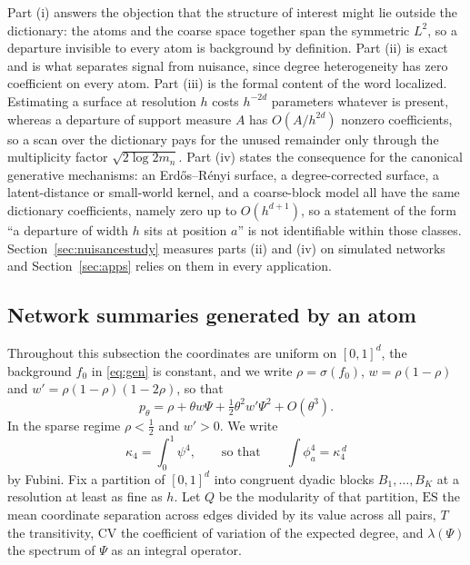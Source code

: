\documentclass[11pt]{article}
\theoremstyle{definition}
\newcommand{\1}{\mathbf 1}\newcommand{\op}{\operatorname}
\begin{document}
Part (i) answers the objection that the structure of interest might lie
outside the dictionary: the atoms and the coarse space together span the
symmetric $L^2$, so a departure invisible to every atom is background by
definition.  Part (ii) is exact and is what separates signal from nuisance,
since degree heterogeneity has zero coefficient on every atom.  Part (iii) is
the formal content of the word localized.  Estimating a surface at resolution
$h$ costs $h^{-2d}$ parameters whatever is present, whereas a departure of
support measure $A$ has $O(A/h^{2d})$ nonzero coefficients, so a scan over the
dictionary pays for the unused remainder only through the multiplicity
factor $\sqrt{2\log2m_n}$.  Part (iv) states the consequence for the
canonical generative mechanisms: an Erd\H os--R\'enyi surface, a
degree-corrected surface, a latent-distance or small-world kernel, and a
coarse-block model all have the same dictionary coefficients, namely zero up
to $O(h^{d+1})$, so a statement of the form ``a departure of width $h$ sits at
position $a$'' is not identifiable within those classes.  Section~\ref{sec:nuisancestudy}
measures parts (ii) and (iv) on simulated networks and
Section~\ref{sec:apps} relies on them in every application.

\subsection{Network summaries generated by an atom}                        \label{sec:thy-gen}

Throughout this subsection the coordinates are uniform on $[0,1]^d$, the
background $f_0$ in \eqref{eq:gen} is constant, and we write $\rho=\sigma(f_0)$,
$w=\rho(1-\rho)$ and $w'=\rho(1-\rho)(1-2\rho)$, so that
\begin{equation}
p_\theta=\rho+\theta w\Psi+\tfrac12\theta^{2}w'\Psi^{2}+O(\theta^{3}).
\label{eq:expand}
\end{equation}
In the sparse regime $\rho<\tfrac12$ and $w'>0$.  We write
\begin{equation}
\kappa_4=\int_0^1\psi^{4},\qquad\text{so that}\qquad\int\phi_a^{4}=\kappa_4^{\,d}
\label{eq:kappa4}
\end{equation}
by Fubini.  Fix a partition of $[0,1]^d$ into congruent dyadic blocks
$B_1,\dots,B_K$ at a resolution at least as fine as $h$.  Let $Q$ be the
modularity of that partition, $\mathrm{ES}$ the mean coordinate separation
across edges divided by its value across all pairs, $T$ the transitivity,
$\mathrm{CV}$ the coefficient of variation of the expected degree, and
$\lambda(\Psi)$ the spectrum of $\Psi$ as an integral operator.
\end{document}
